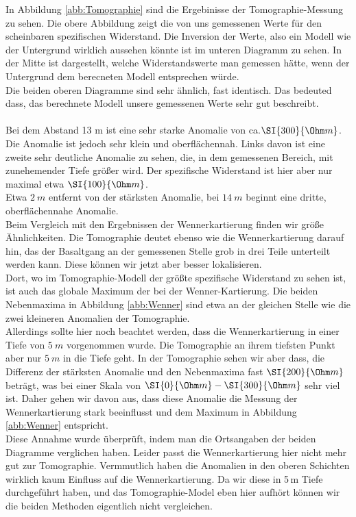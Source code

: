 In Abbildung \ref{abb:Tomographie} sind die Ergebinisse der Tomographie-Messung zu sehen. Die obere Abbildung zeigt die von uns gemessenen Werte für den scheinbaren spezifischen Widerstand. Die Inversion der Werte, also ein Modell wie der Untergrund 
wirklich aussehen könnte ist im unteren Diagramm zu sehen. In der Mitte ist dargestellt, welche Widerstandswerte man gemessen hätte, wenn der Untergrund dem berecneten Modell entsprechen würde.\\
Die beiden oberen Diagramme sind sehr ähnlich, fast identisch. Das bedeuted dass, das berechnete Modell unsere gemessenen Werte sehr gut beschreibt. \\
\\
Bei dem Abstand 13 m ist eine sehr starke Anomalie von ca.$ \SI{ 300}{ \Ohm m}$. Die Anomalie ist jedoch sehr klein und oberflächennah. Links davon ist eine zweite sehr deutliche Anomalie zu sehen, die, in dem gemessenen Bereich,
mit zunehemender Tiefe größer wird. Der spezifische Widerstand ist hier aber nur maximal etwa $\SI{100}{\Ohm m}$. \\
Etwa $\SI{2}{m}$ entfernt von der stärksten Anomalie, bei  $\SI{14}{m}$ beginnt eine dritte, oberflächennahe Anomalie. \\
Beim Vergleich mit den Ergebnissen der Wennerkartierung finden wir größe Ähnlichkeiten. Die Tomographie deutet ebenso wie die Wennerkartierung darauf hin, das der Basaltgang an der gemessenen Stelle grob in drei Teile unterteilt werden kann. 
Diese können wir jetzt aber besser lokalisieren.\\
Dort, wo im Tomographie-Modell der größte spezifische Widerstand zu sehen ist, ist auch das globale Maximum der bei der Wenner-Kartierung. Die beiden Nebenmaxima in Abbildung \ref{abb:Wenner}
sind etwa an der gleichen Stelle wie die zwei kleineren Anomalien der Tomographie. \\ 
Allerdings sollte hier noch beachtet werden, dass die Wennerkartierung in einer Tiefe von $\SI{5}{m}$ vorgenommen wurde. Die Tomographie an ihrem tiefsten Punkt aber nur $\SI{5}{m}$ in die Tiefe geht.
In der Tomographie sehen wir aber dass, die Differenz der stärksten Anomalie und den Nebenmaxima fast $\SI{200}{\Ohm m}$ beträgt, was bei einer Skala von $\SI{0}{\Ohm m}- \SI{300}{\Ohm m}$ sehr viel ist. 
Daher gehen wir davon aus, dass diese Anomalie die Messung der Wennerkartierung stark beeinflusst und dem Maximum in Abbildung \ref{abb:Wenner} entspricht.\\
Diese Annahme wurde überprüft, indem man die Ortsangaben der beiden Diagramme verglichen haben. Leider passt die Wennerkartierung hier nicht mehr gut zur Tomographie. Vermmutlich haben die Anomalien in den oberen Schichten wirklich kaum Einfluss auf die Wennerkartierung. Da wir diese in 5\,m Tiefe durchgeführt haben, und das Tomographie-Model eben hier aufhört können wir die beiden Methoden eigentlich nicht vergleichen.


